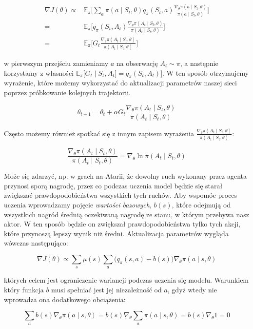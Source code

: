 \documentclass[licencjacka]{pracamgr}
\begin{document}
\begin{align*}
\nabla J(\theta) \propto  & \mathbb{E}_\pi \Bigg[ \sum_{a} \pi(a \mid S_t, \theta) q_\pi (S_t, a) \frac{\nabla_\theta \pi(a \mid S_t, \theta)}{\pi(a \mid S_t, \theta)} \Bigg] \\
= & \mathbb{E}_\pi \Bigg[ q_\pi(S_t, A_t) \frac{\nabla_\theta \pi(A_t \mid S_t, \theta)}{\pi(A_t \mid S_t, \theta)} \Bigg] \\ 
= & \mathbb{E}_\pi \Bigg[ G_t \frac{\nabla_\theta \pi(A_t \mid S_t, \theta)}{\pi(A_t \mid S_t, \theta)} \Bigg] 
\end{align*}

w pierwszym przejściu zamieniamy $a$ na obserwację $A_t \sim \pi$, a następnie korzystamy z własności $ \mathbb{E}_\pi \big[ G_t \mid S_t, A_t \big] = q_\pi(S_t, A_t) \big] $. W ten sposób otrzymujemy wyrażenie, które możemy wykorzystać do aktualizacji parametrów naszej sieci poprzez próbkowanie kolejnych trajektorii.

$$ \theta_{t+1} = \theta_t + \alpha G_t \frac{\nabla_\theta \pi(A_t \mid S_t, \theta)}{\pi(A_t \mid S_t, \theta)} $$

Często możemy również spotkać się z innym zapisem wyrażenia $  \frac{\nabla_\theta \pi(A_t \mid S_t, \theta)}{\pi(A_t \mid S_t, \theta)}$:

$$  \frac{\nabla_\theta \pi(A_t \mid S_t, \theta)}{\pi(A_t \mid S_t, \theta)} = \nabla_\theta \ln \pi(A_t \mid S_t, \theta) $$

Może się zdarzyć, np. w grach na Atarii, że dowolny ruch wykonany przez agenta przynosi sporą nagrodę, przez co podczas uczenia model będzie się starał zwiększać prawdopodobieństwa wszystkich tych ruchów. Aby wspomóc proces uczenia wprowadzamy pojęcie \emph{wartości bazowych}, $b(s)$, które odejmują od wszystkich nagród średnią oczekiwaną nagrodę ze stanu, w którym przebywa nasz aktor. W ten sposób będzie on zwiększał prawdopodobieństwa tylko tych akcji, które przynoszą lepszy wynik niż średni. Aktualizacja parametrów wygląda wówczas następująco:

$$ \nabla J(\theta) \propto \sum_s \mu(s) \sum_a \Big( q_\pi(s, a) - b(s) \Big) \nabla_\theta \pi(a \mid s, \theta) $$

których celem jest ograniczenie wariancji podczas uczenia się modelu. Warunkiem który funkcja $b$ musi spełniać jest jej niezależność od $a$, gdyż wtedy nie wprowadza ona dodatkowego obciążenia:

$$ \sum_a b(s) \nabla_\theta \pi(a \mid s, \theta) = b(s) \nabla_\theta \sum_a \pi(a \mid s, \theta) = b(s) \nabla_\theta 1 = 0 $$
\end{document}
